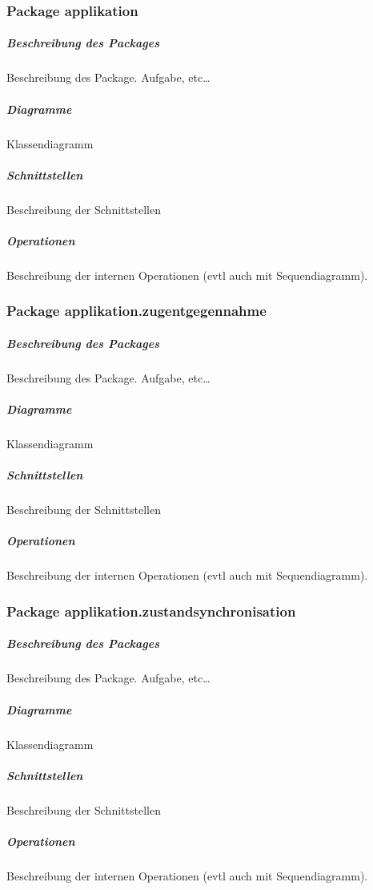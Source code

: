 \documentclass[a4paper,12pt,halfparskip,DIV14]{scrartcl}
\begin{document}
\newpage
\subsubsection{Package applikation} %
\label{ssub:package_applikation}
\subparagraph{Beschreibung des Packages} %
\label{ssub:beschreibung_des_packages}
Beschreibung des Package. Aufgabe, etc…
\subparagraph{Diagramme} %
\label{ssub:diagramme}
Klassendiagramm
\subparagraph{Schnittstellen} %
\label{ssub:schnittstellen}
Beschreibung der Schnittstellen
\subparagraph{Operationen} %
\label{ssub:operationen}
Beschreibung der internen Operationen (evtl auch mit Sequendiagramm).

\newpage
\subsubsection{Package applikation.zugentgegennahme} %
\label{ssub:package_applikation_zugentgegennahme}
\subparagraph{Beschreibung des Packages} %
\label{ssub:beschreibung_des_packages}
Beschreibung des Package. Aufgabe, etc…
\subparagraph{Diagramme} %
\label{ssub:diagramme}
Klassendiagramm
\subparagraph{Schnittstellen} %
\label{ssub:schnittstellen}
Beschreibung der Schnittstellen
\subparagraph{Operationen} %
\label{ssub:operationen}
Beschreibung der internen Operationen (evtl auch mit Sequendiagramm).

\newpage
\subsubsection{Package applikation.zustandsynchronisation} %
\label{ssub:package_app_zustandsynchronisation}
\subparagraph{Beschreibung des Packages} %
\label{ssub:beschreibung_des_packages}
Beschreibung des Package. Aufgabe, etc…
\subparagraph{Diagramme} %
\label{ssub:diagramme}
Klassendiagramm
\subparagraph{Schnittstellen} %
\label{ssub:schnittstellen}
Beschreibung der Schnittstellen
\subparagraph{Operationen} %
\label{ssub:operationen}
Beschreibung der internen Operationen (evtl auch mit Sequendiagramm).
\end{document}
